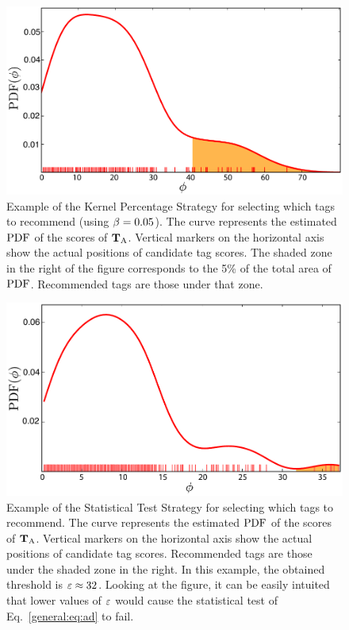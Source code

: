 \begin{figure}[t]
  \centerline{
  \includegraphics[width=\figSizeLarge]{ch03_general/pics/02_kernel_percentage_example.pdf}}
  \caption[Example of the Kernel Percentage Strategy for selecting which tags to recommend]{Example of the Kernel Percentage Strategy for selecting which tags to recommend (using $\beta = 0.05$). The curve represents the estimated $\text{PDF}$ of the scores of $\mathbf{T}_{\text{A}}$. Vertical markers on the horizontal axis show the actual positions of candidate tag scores. The shaded zone in the right of the figure corresponds to the 5\% of the total area of $\text{PDF}$. 
  Recommended tags are those under that zone.}
  \label{general:fig:kde_percentage_example}
\end{figure}

\begin{figure}
  \centerline{
  \includegraphics[width=\figSizeLarge]{ch03_general/pics/03_statistical_test_example.pdf}}
  \caption[Example of the Statistical Test Strategy for selecting which tags to recommend]{Example of the Statistical Test Strategy for selecting which tags to recommend. The curve represents the estimated $\text{PDF}$ of the scores of $\mathbf{T}_{\text{A}}$. Vertical markers on the horizontal axis show the actual positions of candidate tag scores. 
  Recommended tags are those under the shaded zone in the right. 
  In this example, the obtained threshold is $\varepsilon \approx 32$. Looking at the figure, it can be easily intuited that lower values of $\varepsilon$ would cause the statistical test of Eq.~\ref{general:eq:ad} to fail.}
  \label{general:fig:kde_example}
\end{figure}

